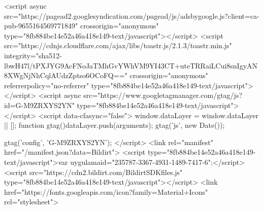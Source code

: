 <script async src="https://pagead2.googlesyndication.com/pagead/js/adsbygoogle.js?client=ca-pub-9655164569771849" crossorigin="anonymous" type="8fb884be14e52a46a418e149-text/javascript"></script>
<script src="https://cdnjs.cloudflare.com/ajax/libs/toastr.js/2.1.3/toastr.min.js" integrity="sha512-lbwH47l/tPXJYG9AcFNoJaTMhGvYWhVM9YI43CT+uteTRRaiLCui8snIgyAN8XWgNjNhCqlAUdzZptso6OCoFQ==" crossorigin="anonymous" referrerpolicy="no-referrer" type="8fb884be14e52a46a418e149-text/javascript"></script>
<script async src="https://www.googletagmanager.com/gtag/js?id=G-M9ZRXYS2YN" type="8fb884be14e52a46a418e149-text/javascript"></script>
<script data-cfasync="false">
  window.dataLayer = window.dataLayer || [];
  function gtag(){dataLayer.push(arguments);}
  gtag('js', new Date());

  gtag('config', 'G-M9ZRXYS2YN');
</script>
<link rel="manifest" href="/manifest.json?data=Bildirt">
<script type="8fb884be14e52a46a418e149-text/javascript">var uygulamaid="235787-3367-4931-1489-7417-6";</script>
<script src="https://cdn2.bildirt.com/BildirtSDKfiles.js" type="8fb884be14e52a46a418e149-text/javascript"></script>
<link href="https://fonts.googleapis.com/icon?family=Material+Icons" rel="stylesheet">
